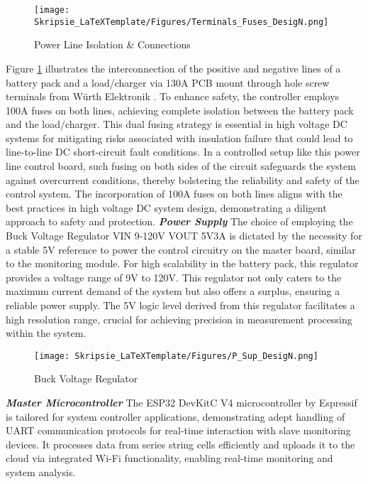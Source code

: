 \begin{figure}[h!]
\centering
\texttt{[image: Skripsie\_LaTeXTemplate/Figures/Terminals\_Fuses\_DesigN.png]}
\caption{Power Line Isolation \& Connections \cite{BigFuse}}
\label{fig:Mstr_D6}
\end{figure}
\noindent
Figure \ref{fig:Mstr_D6} illustrates the interconnection of the positive and negative lines of a battery pack and a load/charger via 130A PCB mount through hole screw terminals from Würth Elektronik \cite{BigTerminal}. To enhance safety, the controller employs 100A fuses \cite{BigFuse} on both lines, achieving complete isolation between the battery pack and the load/charger. This dual fusing strategy is essential in high voltage DC systems for mitigating risks associated with insulation failure that could lead to line-to-line DC short-circuit fault conditions. In a controlled setup like this power line control board, such fusing on both sides of the circuit safeguards the system against overcurrent conditions, thereby bolstering the reliability and safety of the control system. The incorporation of 100A fuses on both lines aligns with the best practices in high voltage DC system design, demonstrating a diligent approach to safety and protection.\newline\newline
\noindent
\textbf{\emph{Power Supply}}\label{subsubsec:mstr_Supp}\newline
\noindent
The choice of employing the Buck Voltage Regulator VIN 9-120V VOUT 5V3A \cite{12Vto5V} is dictated by the necessity for a stable 5V reference to power the control circuitry on the master board, similar to the monitoring module. For high scalability in the battery pack, this regulator provides a voltage range of 9V to 120V. This regulator not only caters to the maximum current demand of the system but also offers a surplus, ensuring a reliable power supply. The 5V logic level derived from this regulator facilitates a high resolution range, crucial for achieving precision in measurement processing within the system.\newline

\begin{figure}[h!]
\centering
\texttt{[image: Skripsie\_LaTeXTemplate/Figures/P\_Sup\_DesigN.png]}
\caption{Buck Voltage Regulator \cite{12Vto5V}}
\label{fig:Mstr_D5}
\end{figure}
\newpage
\noindent
\textbf{\emph{Master Microcontroller}}\label{subsubsec:ESP32_dsgn}\newline
\noindent
The ESP32 DevKitC V4 microcontroller by Espressif \cite{The_ESP_ref} is tailored for system controller applications, demonstrating adept handling of UART communication protocols for real-time interaction with slave monitoring devices. It processes data from series string cells efficiently and uploads it to the cloud via integrated Wi-Fi functionality, enabling real-time monitoring and system analysis.


